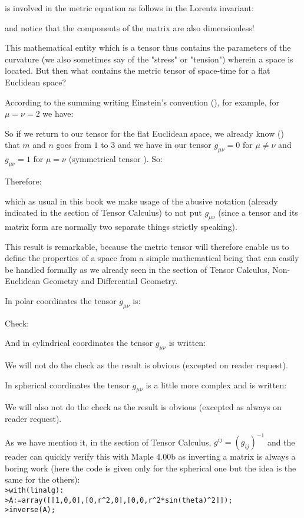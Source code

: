 	is involved in the metric equation as follows in the Lorentz invariant:
	
	and notice that the components of the matrix are also dimensionless!
	
	This mathematical entity which is a tensor thus contains the parameters of the curvature (we also sometimes say of the "stress" or "tension") wherein a space is located. But then what contains the metric tensor of space-time for a flat Euclidean space?
	
	According to the summing writing Einstein's convention (), for example, for $\mu=\nu=2$ we have:
	
	So if we return to our tensor for the flat Euclidean space, we already know () that $m$ and $n$ goes from $1$ to $3$ and we have in our tensor $g_{\mu\nu}=0$ for $\mu\neq \nu$ and $g_{\mu\nu}=1$ for  $\mu= \nu$  (symmetrical tensor ). So:
	
	Therefore:
	
	which as usual in this book we make usage of the abusive notation (already indicated in the section of Tensor Calculus) to not put $g_{\mu\nu}$ (since a tensor and its matrix form are normally two separate things strictly speaking).

	This result is remarkable, because the metric tensor will therefore enable us to define the properties of a space from a simple mathematical being that can easily be handled formally as we already seen in the section of Tensor Calculus, Non-Euclidean Geometry and Differential Geometry.

	In polar coordinates the tensor $g_{\mu\nu}$ is:
	
	Check:
	
	And in cylindrical coordinates the tensor $g_{\mu\nu}$ is written:
	
	We will not do the check as the result is obvious (excepted on reader request).
	
	In spherical coordinates the tensor $g_{\mu\nu}$ is a little more complex and is written:
	
	We will also not do the check as the result is obvious (excepted as always on reader request). 
	\begin{tcolorbox}[title=Remark,colframe=black,arc=10pt]
	As we have mention it, in the section of Tensor Calculus, $g^{ij}=(g_{ij})^{-1}$ and the reader can quickly verify this with Maple 4.00b as inverting a matrix is always a boring work (here the code is given only for the spherical one but the idea is the same for the others):\\
	
	\texttt{>with(linalg):\\
	>A:=array([[1,0,0],[0,r\string^2,0],[0,0,r\string^2*sin(theta)\string^2]]);\\
	>inverse(A);}
	\end{tcolorbox}
	
